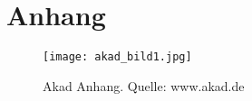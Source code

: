 \section{Anhang}

\begin{figure}[H]
\begin{center}
\texttt{[image: akad\_bild1.jpg]}
\caption[Akad Anhang]{Akad Anhang. Quelle: www.akad.de}
\end{center}
\end{figure}


